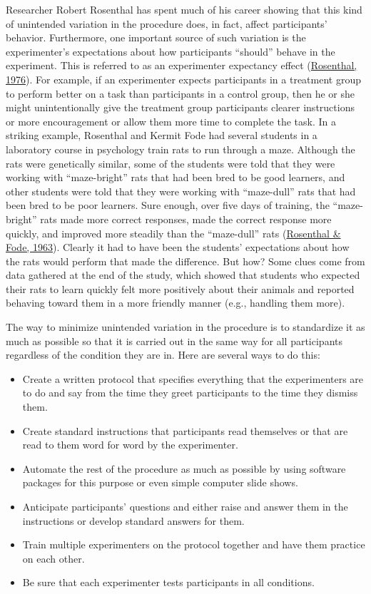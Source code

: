 \documentclass[
]{krantz}
\providecommand{\tightlist}{%
  \setlength{\itemsep}{0pt}\setlength{\parskip}{0pt}}
\begin{document}
Researcher Robert Rosenthal has spent much of his career showing that this kind of unintended variation in the procedure does, in fact, affect participants' behavior. Furthermore, one important source of such variation is the experimenter's expectations about how participants ``should'' behave in the experiment. This is referred to as an experimenter expectancy effect (\protect\hyperlink{ref-rosenthal1976experimenter}{Rosenthal, 1976}). For example, if an experimenter expects participants in a treatment group to perform better on a task than participants in a control group, then he or she might unintentionally give the treatment group participants clearer instructions or more encouragement or allow them more time to complete the task. In a striking example, Rosenthal and Kermit Fode had several students in a laboratory course in psychology train rats to run through a maze. Although the rats were genetically similar, some of the students were told that they were working with ``maze-bright'' rats that had been bred to be good learners, and other students were told that they were working with ``maze-dull'' rats that had been bred to be poor learners. Sure enough, over five days of training, the ``maze-bright'' rats made more correct responses, made the correct response more quickly, and improved more steadily than the ``maze-dull'' rats (\protect\hyperlink{ref-rosenthal1963effect}{Rosenthal \& Fode, 1963}). Clearly it had to have been the students' expectations about how the rats would perform that made the difference. But how? Some clues come from data gathered at the end of the study, which showed that students who expected their rats to learn quickly felt more positively about their animals and reported behaving toward them in a more friendly manner (e.g., handling them more).

The way to minimize unintended variation in the procedure is to standardize it as much as possible so that it is carried out in the same way for all participants regardless of the condition they are in. Here are several ways to do this:

\begin{itemize}
\tightlist
\item
  Create a written protocol that specifies everything that the experimenters are to do and say from the time they greet participants to the time they dismiss them.
\item
  Create standard instructions that participants read themselves or that are read to them word for word by the experimenter.
\item
  Automate the rest of the procedure as much as possible by using software packages for this purpose or even simple computer slide shows.
\item
  Anticipate participants' questions and either raise and answer them in the instructions or develop standard answers for them.
\item
  Train multiple experimenters on the protocol together and have them practice on each other.
\item
  Be sure that each experimenter tests participants in all conditions.
\end{itemize}
\end{document}
